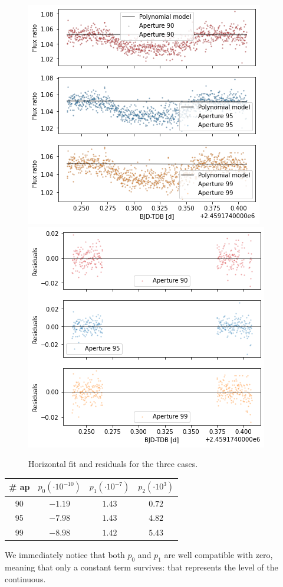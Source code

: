 \documentclass[a4paper,11pt,twocolumn]{article}
\begin{document}
\begin{figure}
    \centering  
    \includegraphics[scale=0.45, angle=0]{../pictures/taste/fit.png}
    \includegraphics[scale=0.45, angle=0]{../pictures/taste/residuals.png}
    \caption{Horizontal fit and residuals for the three cases.}
    \label{fig:fit}
\end{figure}
\begin{center}
    \begin{tabular}{|c|c|c|c|}
    \hline
    \# ap & $p_0 (\cdot 10^{-10})$ & $p_1 (\cdot 10^{-7})$ & $p_2 ( \cdot 10^3)$ \\
    \hline
    90 & $-1.19$ & $1.43$  & $0.72$\\
    95 & $-7.98$ & $1.43$  &  $4.82$\\
    99 & $-8.98$ & $1.42$  & $5.43$\\
    \hline
    \end{tabular}
\end{center}
We immediately notice that both $p_0$ and $p_1$ are well compatible with zero,
meaning that only a constant term survives: that represents the level of the 
continuous. 
\end{document}
